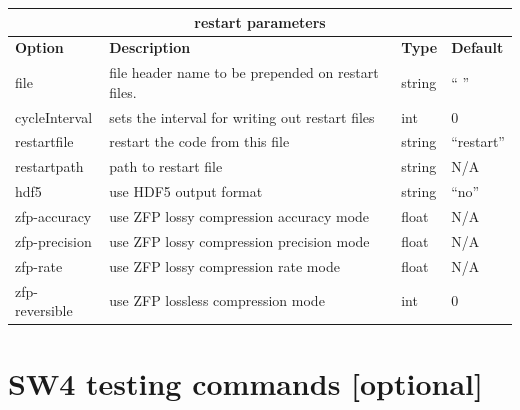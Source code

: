 \documentclass[11pt]{report}
\begin{document}
{\begin{center}
	\begin{tabular}{|l|p{8cm}|l|l|} \hline
		\multicolumn{4}{|c|}{\bf restart parameters}                                                   \\ \hline
		\bf{Option}    & \bf{Description}                                   & \bf{Type} & \bf{Default} \\ \hline \hline
		file           & file header name to be prepended on restart files. & string    & `` ''        \\
		\hline
		cycleInterval  & sets the interval for writing out restart files    & int       & 0            \\
		\hline
		restartfile    & restart the code from this file                    & string    & ``restart''  \\ \hline
		restartpath    & path to restart file                               & string    & N/A          \\ \hline
		hdf5           & use HDF5 output format                             & string    & ``no''       \\ \hline
		zfp-accuracy   & use ZFP lossy compression accuracy mode            & float     & N/A          \\ \hline
		zfp-precision  & use ZFP lossy compression precision mode           & float     & N/A          \\ \hline
		zfp-rate       & use ZFP lossy compression rate mode                & float     & N/A          \\ \hline
		zfp-reversible & use ZFP lossless compression mode                  & int       & 0            \\ \hline
	\end{tabular}
\end{center}



\section{SW4 testing commands [optional]}

}
\end{document}
